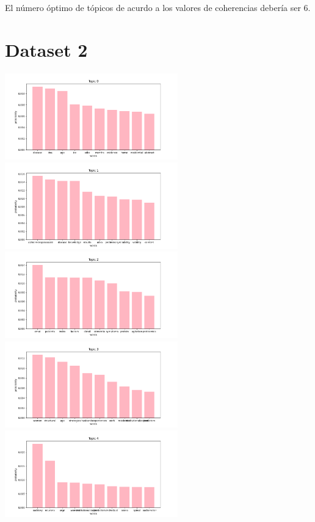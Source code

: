 \documentclass[10pt]{article} %
\begin{document}
	El n\'umero \'optimo de t\'opicos de acurdo a los valores de coherencias deber\'ia ser 6.
	
	
	
	\section{Dataset 2}
	\begin{center}
		\includegraphics[width=7.5cm]{images/plots/test_8_no_stopwords_dataset_2/topic_0.png}
		\includegraphics[width=7.5cm]{images/plots/test_8_no_stopwords_dataset_2/topic_1.png}
		\includegraphics[width=7.5cm]{images/plots/test_8_no_stopwords_dataset_2/topic_2.png}
		\includegraphics[width=7.5cm]{images/plots/test_8_no_stopwords_dataset_2/topic_3.png}\
		\includegraphics[width=7.5cm]{images/plots/test_8_no_stopwords_dataset_2/topic_4.png}

\end{center}
\end{document}
